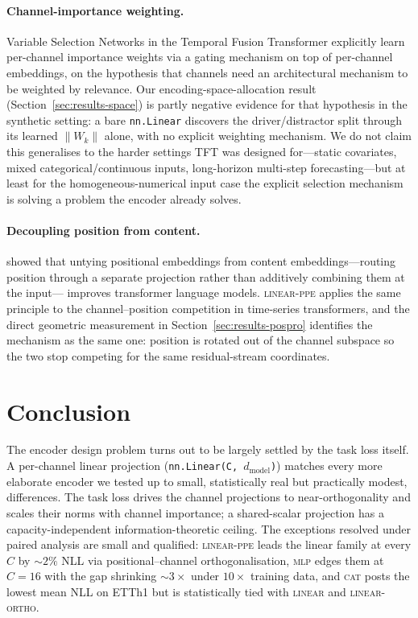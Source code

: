 \documentclass[11pt]{article}
\begin{document}
\paragraph{Channel-importance weighting.}
Variable Selection Networks in the Temporal Fusion Transformer
\citep{lim2021tft} explicitly learn per-channel importance weights
via a gating mechanism on top of per-channel embeddings, on the
hypothesis that channels need an architectural mechanism to be
weighted by relevance. Our encoding-space-allocation result
(Section~\ref{sec:results-space}) is partly negative evidence for
that hypothesis in the synthetic setting: a bare
\texttt{nn.Linear} discovers the driver/distractor split through
its learned $\|W_k\|$ alone, with no explicit weighting
mechanism. We do not claim this generalises to the harder
settings TFT was designed for---static covariates, mixed
categorical/continuous inputs, long-horizon multi-step
forecasting---but at least for the homogeneous-numerical input
case the explicit selection mechanism is solving a problem the
encoder already solves.

\paragraph{Decoupling position from content.}
\citet{ke2021rethinking} showed that untying positional embeddings
from content embeddings---routing position through a separate
projection rather than additively combining them at the input---
improves transformer language models. \textsc{linear-ppe} applies
the same principle to the channel--position competition in
time-series transformers, and the direct geometric measurement in
Section~\ref{sec:results-pospro} identifies the mechanism as the
same one: position is rotated out of the channel subspace so the
two stop competing for the same residual-stream coordinates.

\section{Conclusion}

The encoder design problem turns out to be largely settled by the
task loss itself. A per-channel linear projection
(\texttt{nn.Linear(C, $d_{\text{model}}$)}) matches every more
elaborate encoder we tested up to small, statistically real but
practically modest, differences. The task loss drives the channel
projections to near-orthogonality and scales their norms with
channel importance; a shared-scalar projection has a
capacity-independent information-theoretic ceiling. The exceptions
resolved under paired analysis are small and qualified:
\textsc{linear-ppe} leads the linear family at every $C$ by
${\sim}2\%$ NLL via positional--channel orthogonalisation,
\textsc{mlp} edges them at $C{=}16$ with the gap shrinking
${\sim}3{\times}$ under $10{\times}$ training data, and
\textsc{cat} posts the lowest mean NLL on ETTh1 but is
statistically tied with \textsc{linear} and \textsc{linear-ortho}.
\end{document}
